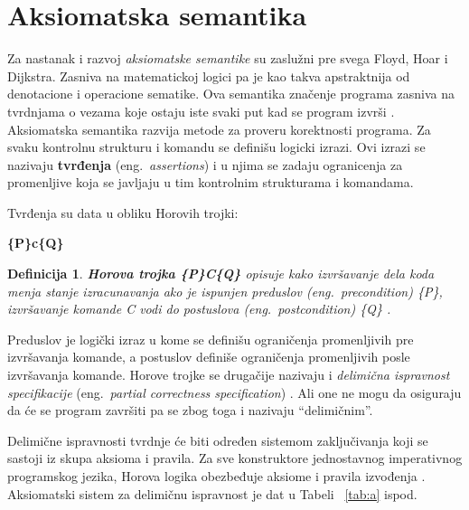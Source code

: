 \documentclass[a4paper]{article}
\newtheorem{definicija}{Definicija}[section]
\begin{document}
{\section{Aksiomatska semantika}
\label{sec:akssem}
\qquad Za nastanak i razvoj \textit{aksiomatske semantike}  su zaslužni pre svega Floyd, Hoar i Dijkstra.
 Zasniva na matematickoj logici pa je kao takva apstraktnija od denotacione i operacione sematike. Ova semantika
 značenje programa zasniva na tvrdnjama o vezama koje ostaju iste svaki put kad se program izvrši \cite{slonneger1995book}.
 Aksiomatska semantika razvija metode za proveru korektnosti programa. Za svaku kontrolnu strukturu i komandu se definišu logicki izrazi. Ovi izrazi se nazivaju \textbf{tvrđenja} (eng.~{\em  assertions}) i u njima se zadaju ogranicenja za promenljive koja se javljaju u tim kontrolnim strukturama i komandama.

\begin{tcolorbox}
Tvrđenja su data u obliku  Horovih trojki:

  \center \textbf{\{P\}c\{Q\}}

\end{tcolorbox}



 
\begin{definicija}
\textbf{Horova trojka \{P\}C\{Q\}} opisuje kako izvršavanje dela koda menja stanje izracunavanja ako je ispunjen preduslov (eng.~{\em  precondition}) \{P\}, izvršavanje komande C vodi do postuslova (eng.~{\em  postcondition}) \{Q\} \cite{milena} .  

\end{definicija}

Preduslov je logički izraz u kome se definišu ograničenja promenljivih pre izvršavanja komande, a postuslov definiše ograničenja promenljivih posle izvršavanja komande.
Horove trojke se drugačije nazivaju i \textit{delimična ispravnost specifikacije } (eng.~{\em  partial correctness specification}) . 
Ali one ne mogu da osiguraju da će se program završiti pa se zbog toga i nazivaju “delimičnim”. 

Delimične ispravnosti tvrdnje će biti određen sistemom zaključivanja koji se sastoji iz skupa aksioma i pravila. Za sve konstruktore jednostavnog imperativnog programskog jezika, Horova logika obezbeđuje aksiome i pravila izvođenja \cite{milena}. Aksiomatski sistem za delimičnu ispravnost je dat u Tabeli ~\ref{tab:a} ispod.

}
\end{document}
